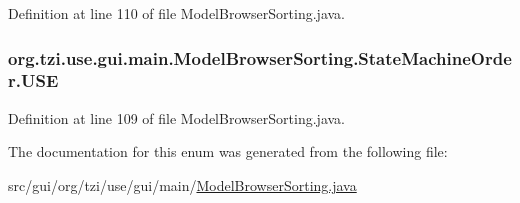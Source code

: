 Definition at line 110 of file Model\-Browser\-Sorting.\-java.

\hypertarget{enumorg_1_1tzi_1_1use_1_1gui_1_1main_1_1_model_browser_sorting_1_1_state_machine_order_a179a3bec29686d676f8aaf9b2bff2f4d}{
\subsubsection[{U\-S\-E}]{\setlength{\rightskip}{0pt plus 5cm}org.\-tzi.\-use.\-gui.\-main.\-Model\-Browser\-Sorting.\-State\-Machine\-Order.\-U\-S\-E}}\label{enumorg_1_1tzi_1_1use_1_1gui_1_1main_1_1_model_browser_sorting_1_1_state_machine_order_a179a3bec29686d676f8aaf9b2bff2f4d}


Definition at line 109 of file Model\-Browser\-Sorting.\-java.



The documentation for this enum was generated from the following file\-:\begin{DoxyCompactItemize}
\item 
src/gui/org/tzi/use/gui/main/\hyperlink{_model_browser_sorting_8java}{Model\-Browser\-Sorting.\-java}\end{DoxyCompactItemize}
